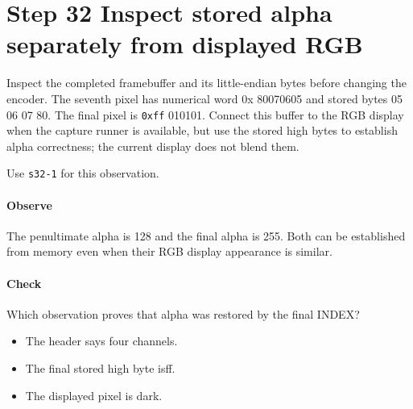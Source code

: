 \section{Step 32 Inspect stored alpha separately from displayed RGB}\label{qoi-s32}
Inspect the completed framebuffer and its little-endian bytes before changing the encoder. The seventh pixel has numerical word 0x 80070605 and stored bytes 05 06 07 80. The final pixel is \texttt{0xff} 010101. Connect this buffer to the RGB display when the capture runner is available, but use the stored high bytes to establish alpha correctness; the current display does not blend them.

Use \texttt{s32-1} for this observation.

\paragraph{Observe} The penultimate alpha is 128 and the final alpha is 255. Both can be established from memory even when their RGB display appearance is similar.

\paragraph{Check} Which observation proves that alpha was restored by the final INDEX?
\begin{itemize}
  \item[A.] The header says four channels.
  \item[B.] The final stored high byte isff.
  \item[C.] The displayed pixel is dark.
\end{itemize}
